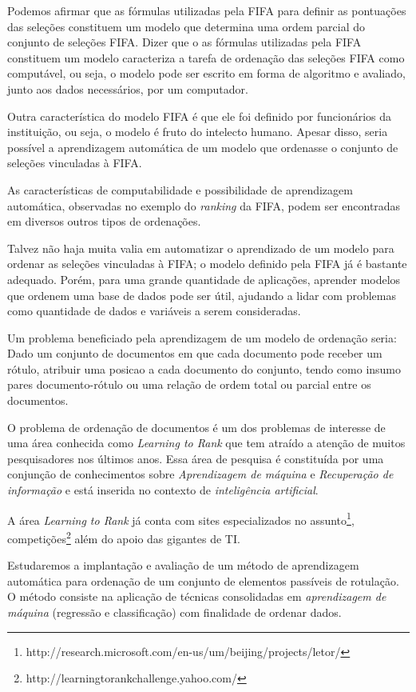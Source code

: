 Podemos afirmar que as fórmulas utilizadas pela FIFA para definir as pontuações das seleções constituem um modelo que determina uma ordem parcial do conjunto de seleções FIFA. Dizer que o as fórmulas utilizadas pela FIFA constituem um modelo caracteriza a tarefa de ordenação das seleções FIFA como computável, ou seja, o modelo pode ser escrito em forma de algoritmo e avaliado, junto aos dados necessários, por um computador.

Outra característica do modelo FIFA é que ele foi definido por funcionários da instituição, ou seja, o modelo é fruto do intelecto humano. Apesar disso, seria possível a aprendizagem automática de um modelo que ordenasse o conjunto de seleções vinculadas à FIFA.

As características de computabilidade e possibilidade de aprendizagem automática, observadas no exemplo do \emph{ranking} da FIFA, podem ser encontradas em diversos outros tipos de ordenações.

Talvez não haja muita valia em automatizar o aprendizado de um modelo para ordenar as seleções vinculadas à FIFA; o modelo definido pela FIFA já é bastante adequado. Porém, para uma grande quantidade de aplicações, aprender modelos que ordenem uma base de dados pode ser útil, ajudando a lidar com problemas como quantidade de dados e variáveis a serem consideradas.

Um problema beneficiado pela aprendizagem de um modelo de ordenação seria: Dado um conjunto de documentos em que cada documento pode receber um rótulo, atribuir uma posicao a cada documento do conjunto, tendo como insumo pares documento-rótulo ou uma relação de ordem total ou parcial entre os documentos.

O problema de ordenação de documentos é um dos problemas de interesse de uma área  conhecida como \emph{Learning to Rank} que tem atraído a atenção de muitos pesquisadores nos últimos anos. Essa área de pesquisa é constituída por uma conjunção de conhecimentos sobre \emph{Aprendizagem de máquina} e \emph{Recuperação de informação} e está inserida no contexto de \emph{inteligência artificial}.

A área \emph{Learning to Rank} já conta com sites especializados no assunto\footnote{http://research.microsoft.com/en-us/um/beijing/projects/letor/}, competições\footnote{http://learningtorankchallenge.yahoo.com/} além do apoio das gigantes de TI.

Estudaremos a implantação e avaliação de um método de aprendizagem automática para ordenação de um conjunto de elementos passíveis de rotulação. O método consiste na aplicação de técnicas consolidadas em \emph{aprendizagem de máquina} (regressão e classificação) com finalidade de ordenar dados.